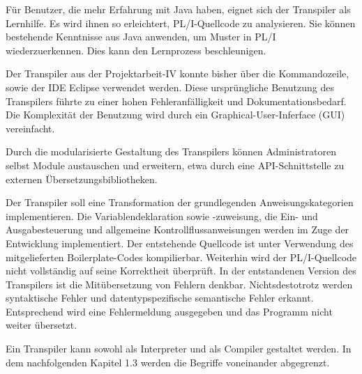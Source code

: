 Für Benutzer, die mehr Erfahrung mit Java haben, eignet sich der Transpiler als Lernhilfe. Es wird ihnen so erleichtert, PL/I-Quellcode zu analysieren. Sie können bestehende Kenntnisse aus Java anwenden, um Muster in PL/I wiederzuerkennen. Dies kann den Lernprozess beschleunigen.

Der Transpiler aus der Projektarbeit-IV konnte bisher über die Kommandozeile, sowie der IDE Eclipse verwendet werden. Diese ursprüngliche Benutzung des Transpilers führte zu einer hohen Fehleranfälligkeit und Dokumentationsbedarf. Die Komplexität der Benutzung wird durch ein Graphical-User-Inferface (GUI) vereinfacht.

Durch die modularisierte Gestaltung des Transpilers können Administratoren selbst Module austauschen und erweitern, etwa durch eine API-Schnittstelle zu externen Übersetzungsbibliotheken. 


Der Transpiler soll eine Transformation der grundlegenden Anweisungskategorien implementieren. Die Variablendeklaration sowie -zuweisung, die Ein- und Ausgabesteuerung und allgemeine Kontrollflussanweisungen werden im Zuge der Entwicklung implementiert. Der entstehende Quellcode ist unter Verwendung des mitgelieferten Boilerplate-Codes kompilierbar. Weiterhin wird der PL/I-Quellcode nicht vollständig auf seine Korrektheit überprüft. In der entstandenen Version des Transpilers ist die Mitübersetzung von Fehlern denkbar. Nichtsdestotrotz werden syntaktische Fehler und datentypspezifische semantische Fehler erkannt. Entsprechend wird eine Fehlermeldung ausgegeben und das Programm nicht weiter übersetzt.

Ein Transpiler kann sowohl als Interpreter und als Compiler gestaltet werden. In dem nachfolgenden Kapitel 1.3 werden die Begriffe voneinander abgegrenzt. 
	
%
	
